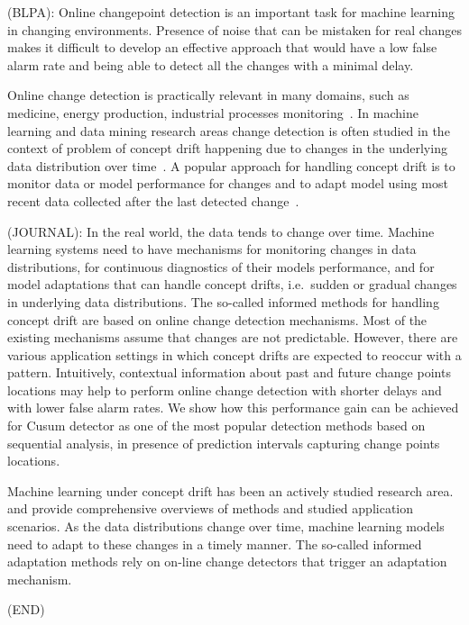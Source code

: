 (BLPA):
Online changepoint detection is an important task for machine learning in changing environments.
Presence of noise that can be mistaken for real changes makes it difficult to develop an effective approach that would have a low false alarm rate and being able to detect all the changes with a minimal delay.

Online change detection is practically relevant in many domains, such as medicine, energy production, industrial processes monitoring~\cite{Nikiforov}.
In machine learning and data mining research areas change detection is often studied in the context of problem of concept drift happening due to changes in the underlying data distribution over time~\cite{Widmer96}. A popular approach for handling concept drift is to monitor data or model performance for changes and to adapt model using most recent data collected after the last detected change~\cite{GamaACMCS2014}.

(JOURNAL):
In the real world, the data tends to change over time.
Machine learning systems need to have mechanisms for monitoring changes in data distributions, for continuous diagnostics of their models performance, and for model adaptations that can handle concept drifts, i.e.\ sudden or gradual changes in underlying data distributions.
The so-called informed methods for handling concept drift are based on online change detection mechanisms. Most of the existing mechanisms assume that changes are not predictable.
However, there are various application settings in which concept drifts are expected to reoccur with a pattern.
Intuitively, contextual information about past and future change points locations may help to perform online change detection with shorter delays and with lower false alarm rates.
We show how this performance gain can be achieved for Cusum detector as one of the most popular detection methods based on sequential analysis, in presence of prediction intervals capturing change points locations.

Machine learning under concept drift has been an actively studied research area. \cite{gama2014survey} and \cite{zliobaite2016overview} provide comprehensive overviews of methods and studied application scenarios. As the data distributions change over time, machine learning models need to adapt to these changes in a timely manner. The so-called informed adaptation methods rely on on-line change detectors that trigger an adaptation mechanism. 



(END)

